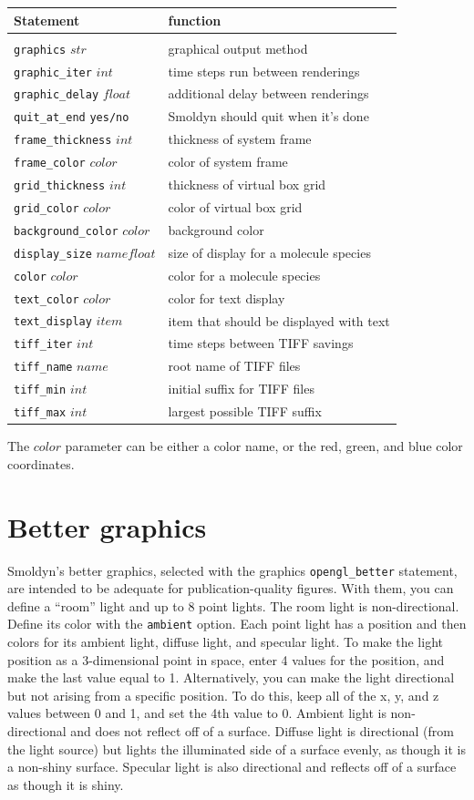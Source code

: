 \documentclass {scrbook}
\newcommand {\ttt} {\texttt}
\begin{document}
\begin{longtable}[c]{ll}
Statement & function\\
\hline\\
\ttt{graphics} $str$ & graphical output method\\
\ttt{graphic\_iter} $int$ & time steps run between renderings\\
\ttt{graphic\_delay} $float$ & additional delay between renderings\\
\ttt{quit\_at\_end} \ttt{yes/no} & Smoldyn should quit when it's done\\
\ttt{frame\_thickness} $int$ & thickness of system frame\\
\ttt{frame\_color} $color$ & color of system frame\\
\ttt{grid\_thickness} $int$ & thickness of virtual box grid\\
\ttt{grid\_color} $color$ & color of virtual box grid\\
\ttt{background\_color} $color$ & background color\\
\ttt{display\_size} $name float$ & size of display for a molecule species\\
\ttt{color} $color$ & color for a molecule species\\
\ttt{text\_color} $color$ & color for text display\\
\ttt{text\_display} $item$ & item that should be displayed with text\\
\ttt{tiff\_iter} $int$ & time steps between TIFF savings\\
\ttt{tiff\_name} $name$ & root name of TIFF files\\
\ttt{tiff\_min} $int$ & initial suffix for TIFF files\\
\ttt{tiff\_max} $int$ & largest possible TIFF suffix\\
\end{longtable}
The $color$ parameter can be either a color name, or the red, green, and blue color coordinates.

\section{Better graphics}

Smoldyn's better graphics, selected with the graphics \ttt{opengl\_better} statement, are intended to be adequate for publication-quality figures. With them, you can define a ``room'' light and up to 8 point lights. The room light is non-directional. Define its color with the \ttt{ambient} option. Each point light has a position and then colors for its ambient light, diffuse light, and specular light. To make the light position as a 3-dimensional point in space, enter 4 values for the position, and make the last value equal to 1. Alternatively, you can make the light directional but not arising from a specific position. To do this, keep all of the x, y, and z values between 0 and 1, and set the 4th value to 0. Ambient light is non-directional and does not reflect off of a surface. Diffuse light is directional (from the light source) but lights the illuminated side of a surface evenly, as though it is a non-shiny surface. Specular light is also directional and reflects off of a surface as though it is shiny.
\end{document}
